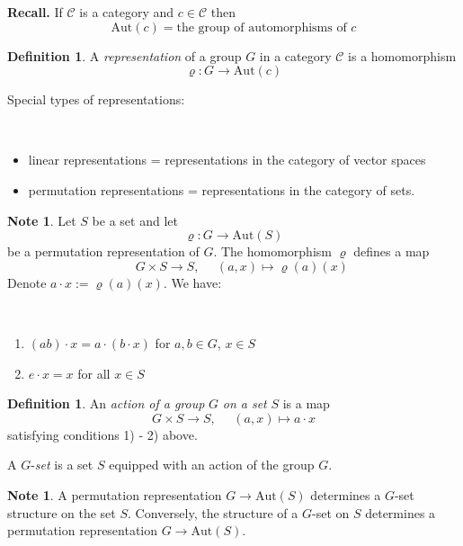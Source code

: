 \documentclass[12pt, letterpaper, oneside]{article}
\theoremstyle{plain}
\theoremstyle{definition}
\newtheorem{definition}[theorem]{Definition}
\newtheorem{note}[theorem]{Note}
\newcommand{\Aut}{\mathrm{Aut}}
\newcommand{\CC}{{\mathcal C}}
\newcommand{\benu}{\begin{enumerate}}
\newcommand{\eenu}{\end{enumerate}}
\newcommand{\bit}{\begin{itemize}}
\newcommand{\eit}{\end{itemize}}
\newcommand{\vs}{\vskip 5mm}
\newcommand{\isep}[1][0]{\setlength{\itemsep}{#1 mm}}
\begin{document}
\textbf{Recall.} If $\CC$ is a category and $c\in \CC$ then 
$$\Aut(c) = \text{the group of automorphisms of } c$$ 

\vs\vs

\begin{definition}
A \emph{representation} of a group $G$ in a category $\CC$ is a homomorphism 
$$\varrho\colon G \to \Aut(c)$$
\end{definition}


Special types of representations:

\vskip -13mm

\ 
\bit
\isep
\item linear representations = representations in the category of vector spaces
\item permutation representations = representations in the category of sets.
\eit


\vs\vs 


\begin{note}
Let $S$ be a set and let 
$$\varrho\colon G \to \Aut(S)$$
be a permutation representation of $G$. The homomorphism $\varrho$ defines a map 
$$\ \ \ \ \ \ G \times S \to S, \ \ \ \ \ \ (a, x) \mapsto \varrho(a)(x)$$ 
Denote $a\cdot x := \varrho(a)(x)$.
We have:

\vskip -13mm

\ 
\benu 
\isep
\item $(ab)\cdot x = a\cdot(b\cdot x)$ for $a, b\in G$, $x\in S$
\item $e\cdot x = x$ for all $x\in S$ 
\eenu
\end{note}


\vs\vs

\begin{definition}
An \emph{action of a group} $G$ \emph{on a set} $S$ is a map 
$$G\times S \to S, \ \ \ \ \ \ (a,x) \mapsto a\cdot x$$
satisfying conditions 1) - 2) above.

A $G$-\emph{set} is a set $S$ equipped with an action of the group $G$. 
\end{definition}


\vs

\begin{note}
A permutation representation $G \to \Aut(S)$ determines a $G$-set structure on the set 
$S$. Conversely, the structure of a $G$-set on $S$ determines a permutation representation 
$G \to \Aut(S)$. 
\end{note}

\vs
\end{document}
